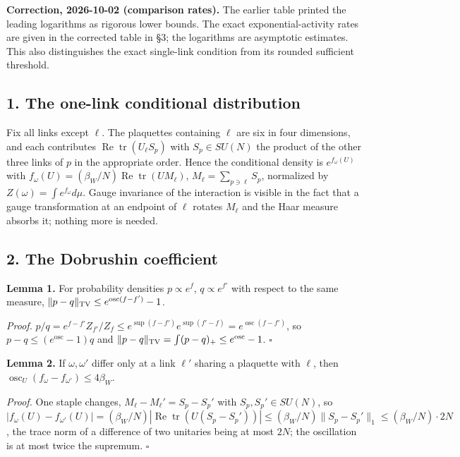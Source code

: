 \documentclass[11pt,a4paper]{article}
\begin{document}
\textbf{Correction, 2026-10-02 (comparison rates).} The earlier table
printed the leading logarithms as rigorous lower bounds. The exact
exponential-activity rates are given in the corrected table in §3; the
logarithms are asymptotic estimates. This also distinguishes the exact
single-link condition from its rounded sufficient threshold.

\hypertarget{the-one-link-conditional-distribution}{%
\subsection{1. The one-link conditional
distribution}\label{the-one-link-conditional-distribution}}

Fix all links except \(\ell\). The plaquettes containing \(\ell\) are
six in four dimensions, and each contributes
\(\operatorname{Re}\operatorname{tr}(U_\ell S_p)\) with \(S_p\in SU(N)\)
the product of the other three links of \(p\) in the appropriate order.
Hence the conditional density is \(e^{f_\omega(U)}\) with
\(f_\omega(U)=(\beta_W/N)\operatorname{Re}\operatorname{tr}(UM_\ell)\),
\(M_\ell=\sum_{p\ni\ell}S_p\), normalized by
\(Z(\omega)=\int e^{f_\omega}d\mu\). Gauge invariance of the interaction
is visible in the fact that a gauge transformation at an endpoint of
\(\ell\) rotates \(M_\ell\) and the Haar measure absorbs it; nothing
more is needed.

\hypertarget{the-dobrushin-coefficient}{%
\subsection{2. The Dobrushin
coefficient}\label{the-dobrushin-coefficient}}

\textbf{Lemma 1.} For probability densities \(p\propto e^f\),
\(q\propto e^{f'}\) with respect to the same measure,
\(\|p-q\|_{\rm TV}\le e^{\operatorname{osc}(f-f')}-1\).

\emph{Proof.}
\(p/q=e^{f-f'}Z_{f'}/Z_f\le e^{\sup(f-f')}e^{\sup(f'-f)}=e^{\operatorname{osc}(f-f')}\),
so \(p-q\le(e^{\operatorname{osc}}-1)q\) and
\(\|p-q\|_{\rm TV}=\int(p-q)_+\le e^{\operatorname{osc}}-1\).
\(\square\)

\textbf{Lemma 2.} If \(\omega,\omega'\) differ only at a link \(\ell'\)
sharing a plaquette with \(\ell\), then
\(\operatorname{osc}_U(f_\omega-f_{\omega'})\le4\beta_W\).

\emph{Proof.} One staple changes, \(M_\ell-M_\ell'=S_p-S_p'\) with
\(S_p,S_p'\in SU(N)\), so
\(|f_\omega(U)-f_{\omega'}(U)|=(\beta_W/N)|\operatorname{Re}\operatorname{tr}(U(S_p-S_p'))|\le(\beta_W/N)\|S_p-S_p'\|_1\le(\beta_W/N)\cdot2N\),
the trace norm of a difference of two unitaries being at most \(2N\);
the oscillation is at most twice the supremum. \(\square\)
\end{document}

